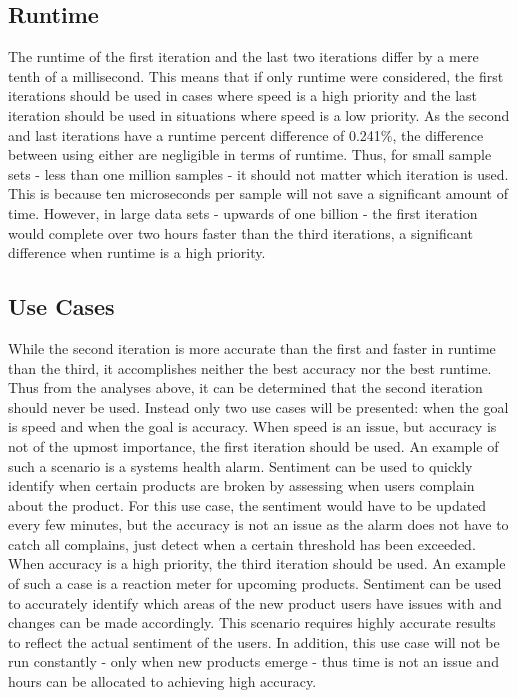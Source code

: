 \newpage
\subsection{Runtime} %
\label{sub:runtime}
The runtime of the first iteration and the last two iterations differ by a mere tenth of a millisecond.  This means that if only runtime were considered, the first iterations should be used in cases where speed is a high priority and the last iteration should be used in situations where speed is a low priority.  As the second and last iterations have a runtime percent difference of 0.241\%, the difference between using either are negligible in terms of runtime.  Thus, for small sample sets - less than one million samples - it should not matter which iteration is used.  This is because ten microseconds per sample will not save a significant amount of time.  However, in large data sets - upwards of one billion - the first iteration would complete over two hours faster than the third iterations, a significant difference when runtime is a high priority.

\subsection{Use Cases} %
\label{sub:use_cases}
While the second iteration is more accurate than the first and faster in runtime than the third, it accomplishes neither the best accuracy nor the best runtime.  Thus from the analyses above, it can be determined that the second iteration should never be used. Instead only two use cases will be presented: when the goal is speed and when the goal is accuracy.  When speed is an issue, but accuracy is not of the upmost importance, the first iteration should be used. An example of such a scenario is a systems health alarm.  Sentiment can be used to quickly identify when certain products are broken by assessing when users complain about the product.  For this use case, the sentiment would have to be updated every few minutes, but the accuracy is not an issue as the alarm does not have to catch all complains, just detect when a certain threshold has been exceeded.  When accuracy is a high priority, the third iteration should be used. An example of such a case is a reaction meter for upcoming products.  Sentiment can be used to accurately identify which areas of the new product users have issues with and changes can be made accordingly. This scenario requires highly accurate results to reflect the actual sentiment of the users. In addition, this use case will not be run constantly - only when new products emerge - thus time is not an issue and hours can be allocated to achieving high accuracy.

